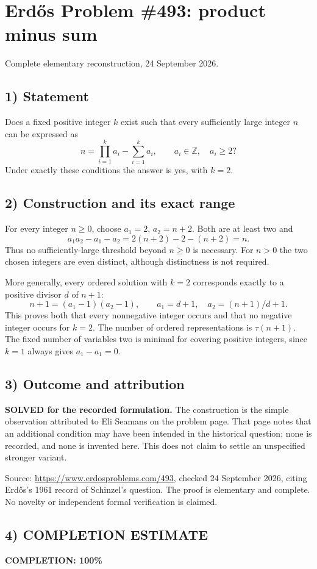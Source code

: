 \section{Erd\H{o}s Problem \#493: product minus sum}
\noindent Complete elementary reconstruction, 24 September 2026.

\subsection*{1) Statement}
Does a fixed positive integer $k$ exist such that every sufficiently large integer $n$ can be expressed as
\[n=\prod_{i=1}^k a_i-\sum_{i=1}^k a_i,\qquad a_i\in\mathbb Z,\quad a_i\ge2?\]
Under exactly these conditions the answer is yes, with $k=2$.

\subsection*{2) Construction and its exact range}
For every integer $n\ge0$, choose $a_1=2$, $a_2=n+2$. Both are at least two and
\[a_1a_2-a_1-a_2=2(n+2)-2-(n+2)=n.\]
Thus no sufficiently-large threshold beyond $n\ge0$ is necessary. For $n>0$ the two chosen integers are even distinct, although distinctness is not required.

More generally, every ordered solution with $k=2$ corresponds exactly to a positive divisor $d$ of $n+1$:
\[n+1=(a_1-1)(a_2-1),\qquad
a_1=d+1,\quad a_2=(n+1)/d+1.\]
This proves both that every nonnegative integer occurs and that no negative integer occurs for $k=2$. The number of ordered representations is $\tau(n+1)$. The fixed number of variables two is minimal for covering positive integers, since $k=1$ always gives $a_1-a_1=0$.

\subsection*{3) Outcome and attribution}
\textbf{SOLVED for the recorded formulation.} The construction is the simple observation attributed to Eli Seamans on the problem page. That page notes that an additional condition may have been intended in the historical question; none is recorded, and none is invented here. This does not claim to settle an unspecified stronger variant.

Source: \url{https://www.erdosproblems.com/493}, checked 24 September 2026, citing Erd\H{o}s's 1961 record of Schinzel's question. The proof is elementary and complete. No novelty or independent formal verification is claimed.

\subsection*{4) COMPLETION ESTIMATE}
\textbf{COMPLETION: 100\%}
